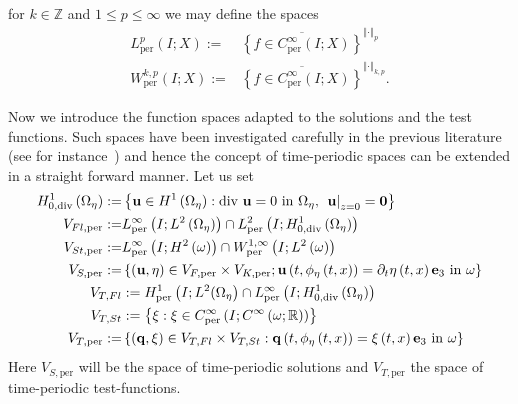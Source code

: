 \documentclass[10pt,a4paper]{article}
\numberwithin{equation}{section}
\begin{document}
 for $k \in \mathbb{Z}$ and $1\le p\le \infty$  we may define the  spaces
\begin{align*}
L_{\text{per}}^{p}\left(I;X\right):= & \overline{\left\{ f\in C_{\text{per}}^{\infty}\left(I;X\right)\right\} }^{\left\Vert \cdot\right\Vert _{p}}\\
W_{\text{per}}^{k,p}\left(I;X\right):= & \overline{\left\{ f\in C_{\text{per}}^{\infty}\left(I;X\right)\right\} }^{\left\Vert \cdot\right\Vert _{k,p}}.
\end{align*}
 
Now we introduce the function spaces adapted to the solutions and the test functions. 
  Such spaces have been investigated carefully in the previous literature (see for instance~\cite{LR14}) and hence the concept of time-periodic spaces can be extended in a straight forward manner. 
Let us set
\begin{equation}\label{eqn:def-function-spaces}
\begin{aligned}H_{0,\text{div}}^{1}\left(\Omega_{\eta}\right):= & \left\{ \mathbf{u}\in H^{1}\left(\Omega_{\eta}\right):\text{div}\ \mathbf{u}=0\text{ in }\Omega_{\eta},\ \left.\mathbf{u}\right|_{z=0}=\mathbf{0}\right\} \\
V_{Fl,\text{per}}:= & L_{\text{per}}^{\infty}\left(I;L^{2}\left(\Omega_{\eta}\right)\right)\cap L_{\text{per}}^{2}\left(I;H_{0,\text{div}}^{1}\left(\Omega_{\eta}\right)\right)\\
V_{St,\text{per}}:= & L_{\text{per}}^{\infty}\left(I;H^{2}\left(\omega\right)\right)\cap W_{\text{per}}^{1,\infty}\left(I;L^{2}\left(\omega\right)\right)\\
V_{S,\text{per}}:= & \left\{ \left(\mathbf{u},\eta\right)\in V_{F,\text{per}}\times V_{K,\text{per}};\mathbf{u}\left(t,\phi_{\eta}\left(t,x\right)\right)=\partial_{t}\eta\left(t,x\right)\text{\ensuremath{\mathbf{e}_{3}} in }\omega\right\} \\
V_{T,Fl} & :=H_{\text{per}}^{1}\left(I;L^{2}(\Omega_{\eta}\right)\cap L_{\text{per}}^{\infty}\left(I;H_{0,\text{div}}^{1}\left(\Omega_{\eta}\right)\right)\\
V_{T,St} & :=\left\{ \xi:\xi\in C_{\text{per}}^{\infty}\left(I;C^{\infty}\left(\omega;\mathbb{R}\right)\right)\right\} \\
V_{T,\text{per}}:= & \left\{ \left(\mathbf{q},\xi\right)\in V_{T,Fl}\times V_{T,St}:\mathbf{q}\left(t,\phi_{\eta}\left(t,x\right)\right)=\xi\left(t,x\right)\mathbf{e}_{3}\ \text{in}\ \omega\right\} 
\end{aligned}
\end{equation}
Here $V_{S,\text{per}}$ will be the space of time-periodic solutions and $V_{T,\text{per}}$  the space of time-periodic test-functions.
\end{document}
